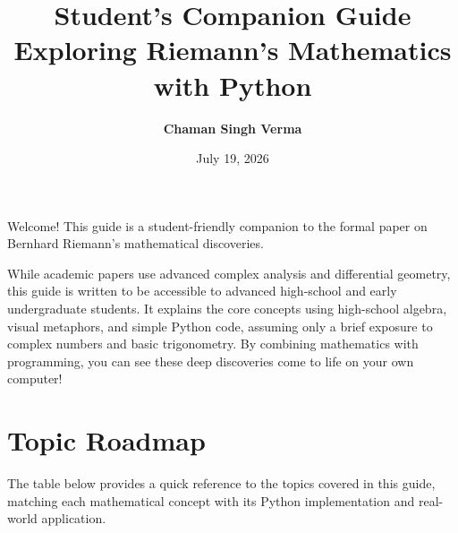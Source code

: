 \documentclass[11pt]{article}
\title{\textbf{Student's Companion Guide}\\[2pt]\large Exploring Riemann's Mathematics with Python}
\author{\textbf{Chaman Singh Verma}}
\date{July 19, 2026}
\begin{document}
\maketitle

Welcome! This guide is a student-friendly companion to the formal paper on Bernhard Riemann's mathematical discoveries.

While academic papers use advanced complex analysis and differential geometry, this guide is written to be accessible to advanced high-school and early undergraduate students. It explains the core concepts using high-school algebra, visual metaphors, and simple Python code, assuming only a brief exposure to complex numbers and basic trigonometry. By combining mathematics with programming, you can see these deep discoveries come to life on your own computer!

\section{Topic Roadmap}
The table below provides a quick reference to the topics covered in this guide, matching each mathematical concept with its Python implementation and real-world application.

\begin{table}[h!]
\centering
\small
{}
\caption{Roadmap of Riemann's concepts explored in this guide.}
\label{tab:roadmap}
\end{table}
\end{document}
